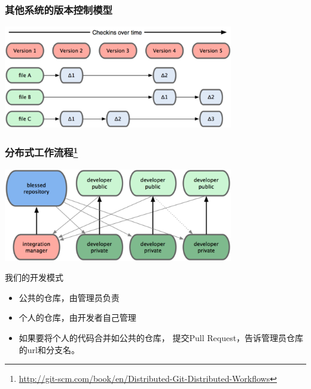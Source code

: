 \begin{frame}
    \frametitle{其他系统的版本控制模型}
    \includegraphics[width=10cm,keepaspectratio]{data/OtherRevisionModel.png}
\end{frame}

\begin{frame}
    \frametitle{分布式工作流程\footnote{\url{http://git-scm.com/book/en/Distributed-Git-Distributed-Workflows}}}
    \includegraphics[width=10cm,keepaspectratio]{data/GitDistributedWorkflow.png}
    \begin{block}{我们的开发模式}
        \begin{itemize}
            \item 公共的仓库，由管理员负责
            \item 个人的仓库，由开发者自己管理
            \item 如果要将个人的代码合并如公共的仓库，
                  提交Pull Request，告诉管理员仓库的url和分支名。
        \end{itemize}
    \end{block}
\end{frame}

